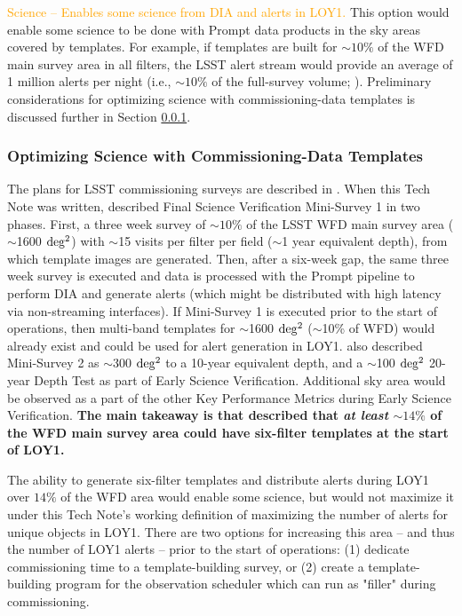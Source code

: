\documentclass[DM,toc]{lsstdoc}
\begin{document}
\textcolor{orange}{ Science -- Enables some science from DIA and alerts in LOY1.}
This option would enable some science to be done with Prompt data products in the sky areas covered by templates.
For example, if templates are built for $\sim10\%$ of the WFD main survey area in all filters, the LSST alert stream would provide an average of 1 million alerts per night (i.e., $\sim10\%$ of the full-survey volume; ).
Preliminary considerations for optimizing science with commissioning-data templates is discussed further in Section \ref{sssec:potsol_comm_r}.



\clearpage
\subsubsection{Optimizing Science with Commissioning-Data Templates}\label{sssec:potsol_comm_r}

The plans for LSST commissioning surveys are described in .
When this Tech Note was written,  described Final Science Verification Mini-Survey 1 in two phases.
First, a three week survey of $\sim10\%$ of the LSST WFD main survey area ($\sim$1600 $\rm deg^2$) with $\sim$15 visits per filter per field ($\sim$1 year equivalent depth), from which template images are generated.
Then, after a six-week gap, the same three week survey is executed and data is processed with the Prompt pipeline to perform DIA and generate alerts (which might be distributed with high latency via non-streaming interfaces).
If Mini-Survey 1 is executed prior to the start of operations, then multi-band templates for $\sim$1600 $\rm deg^2$ ($\sim$10\% of WFD) would already exist and could be used for alert generation in LOY1.
 also described Mini-Survey 2 as $\sim$300 $\rm deg^2$ to a 10-year equivalent depth, and a $\sim$100 $\rm deg^2$ 20-year Depth Test as part of Early Science Verification.
Additional sky area would be observed as a part of the other Key Performance Metrics during Early Science Verification.
{\bf The main takeaway is that  described that {\it at least} $\sim14\%$ of the WFD main survey area could have six-filter templates at the start of LOY1.}

The ability to generate six-filter templates and distribute alerts during LOY1 over $14\%$ of the WFD area would enable some science, but would not maximize it under this Tech Note's working definition of maximizing the number of alerts for unique objects in LOY1.
There are two options for increasing this area -- and thus the number of LOY1 alerts -- prior to the start of operations: (1) dedicate commissioning time to a template-building survey, or (2) create a template-building program for the observation scheduler which can run as "filler" during commissioning.
\end{document}
